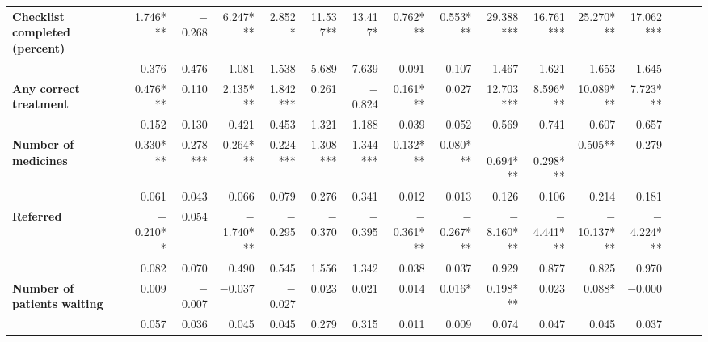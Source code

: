 \begin{tabular}{@{\extracolsep{5pt}}lrrrrrrrrrrrrrrr}
{\bf Checklist completed (percent)} & 1.746*** & $-$0.268\phantom{***} & 6.247*** & 2.852*\phantom{**} & 11.537**\phantom{*} & 13.417*\phantom{**} & 0.762*** & 0.553*** & 29.388*** & 16.761*** & 25.270*** & 17.062*** \\
{\bf } & 0.376\phantom{***} & 0.476\phantom{***} & 1.081\phantom{***} & 1.538\phantom{***} & 5.689\phantom{***} & 7.639\phantom{***} & 0.091\phantom{***} & 0.107\phantom{***} & 1.467\phantom{***} & 1.621\phantom{***} & 1.653\phantom{***} & 1.645\phantom{***} \\
{\bf Any correct treatment} & 0.476*** & 0.110\phantom{***} & 2.135*** & 1.842*** & 0.261\phantom{***} & $-$0.824\phantom{***} & 0.161*** & 0.027\phantom{***} & 12.703*** & 8.596*** & 10.089*** & 7.723*** \\
{\bf } & 0.152\phantom{***} & 0.130\phantom{***} & 0.421\phantom{***} & 0.453\phantom{***} & 1.321\phantom{***} & 1.188\phantom{***} & 0.039\phantom{***} & 0.052\phantom{***} & 0.569\phantom{***} & 0.741\phantom{***} & 0.607\phantom{***} & 0.657\phantom{***} \\
{\bf Number of medicines} & 0.330*** & 0.278*** & 0.264*** & 0.224*** & 1.308*** & 1.344*** & 0.132*** & 0.080*** & $-$0.694*** & $-$0.298*** & 0.505**\phantom{*} & 0.279\phantom{***} \\
{\bf } & 0.061\phantom{***} & 0.043\phantom{***} & 0.066\phantom{***} & 0.079\phantom{***} & 0.276\phantom{***} & 0.341\phantom{***} & 0.012\phantom{***} & 0.013\phantom{***} & 0.126\phantom{***} & 0.106\phantom{***} & 0.214\phantom{***} & 0.181\phantom{***} \\
{\bf Referred} & $-$0.210**\phantom{*} & 0.054\phantom{***} & $-$1.740*** & $-$0.295\phantom{***} & $-$0.370\phantom{***} & $-$0.395\phantom{***} & $-$0.361*** & $-$0.267*** & $-$8.160*** & $-$4.441*** & $-$10.137*** & $-$4.224*** \\
{\bf } & 0.082\phantom{***} & 0.070\phantom{***} & 0.490\phantom{***} & 0.545\phantom{***} & 1.556\phantom{***} & 1.342\phantom{***} & 0.038\phantom{***} & 0.037\phantom{***} & 0.929\phantom{***} & 0.877\phantom{***} & 0.825\phantom{***} & 0.970\phantom{***} \\
{\bf Number of patients waiting} & 0.009\phantom{***} & $-$0.007\phantom{***} & $-$0.037\phantom{***} & $-$0.027\phantom{***} & 0.023\phantom{***} & 0.021\phantom{***} & 0.014\phantom{***} & 0.016*\phantom{**} & 0.198*** & 0.023\phantom{***} & 0.088*\phantom{**} & $-$0.000\phantom{***} \\
{\bf } & 0.057\phantom{***} & 0.036\phantom{***} & 0.045\phantom{***} & 0.045\phantom{***} & 0.279\phantom{***} & 0.315\phantom{***} & 0.011\phantom{***} & 0.009\phantom{***} & 0.074\phantom{***} & 0.047\phantom{***} & 0.045\phantom{***} & 0.037\phantom{***} \\

\end{tabular}
